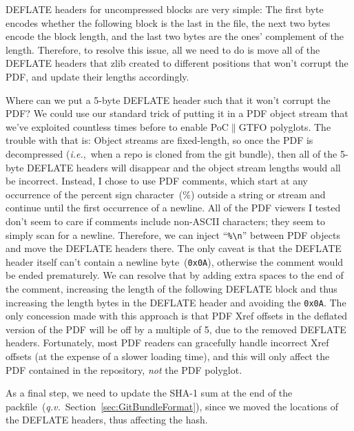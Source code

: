 \documentclass{article}
\begin{document}
DEFLATE headers for uncompressed blocks are very simple: The first
byte encodes whether the following block is the last in the file, the
next two bytes encode the block length, and the last two bytes are the
ones' complement of the length.  Therefore, to resolve this issue, all
we need to do is move all of the DEFLATE headers that zlib created to
different positions that won't corrupt the PDF, and update their
lengths accordingly.

Where can we put a 5-byte DEFLATE header such that it won't corrupt
the PDF? We could use our standard trick of putting it in a PDF object
stream that we've exploited countless times before to enable
PoC$\|$GTFO polyglots. The trouble with that is: Object streams are
fixed-length, so once the PDF is decompressed (\textit{i.e.},~when a
repo is cloned from the git bundle), then all of the 5-byte DEFLATE
headers will disappear and the object stream lengths would all be
incorrect. Instead, I chose to use PDF comments, which start at any
occurrence of the percent sign character~(\%) outside a string or
stream and continue until the first occurrence of a newline.  All of
the PDF viewers I tested don't seem to care if comments include
non-ASCII characters; they seem to simply scan for a
newline. Therefore, we can inject ``\texttt{\%\textbackslash n}''
between PDF objects and move the DEFLATE headers there. The only
caveat is that the DEFLATE header itself can't contain a newline
byte~(\texttt{0x0A}), otherwise the comment would be ended
prematurely.  We can resolve that by adding extra spaces to the end of
the comment, increasing the length of the following DEFLATE block and
thus increasing the length bytes in the DEFLATE header and avoiding
the \texttt{0x0A}. The only concession made with this approach is that
PDF Xref offsets in the deflated version of the PDF will be off by a
multiple of 5, due to the removed DEFLATE headers. Fortunately, most
PDF readers can gracefully handle incorrect Xref offsets (at the
expense of a slower loading time), and this will only affect the PDF
contained in the repository, \emph{not} the PDF polyglot.

As a final step, we need to update the SHA-1 sum at the end of the
packfile~(\textit{q.v.}~Section~\ref{sec:GitBundleFormat}), since we
moved the locations of the DEFLATE headers, thus affecting the hash.
\end{document}
